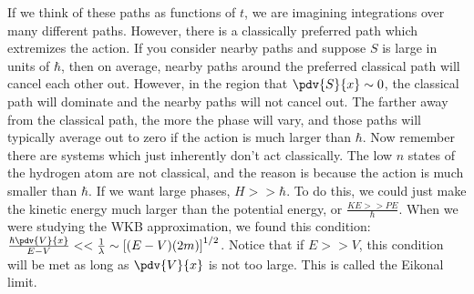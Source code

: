 \documentclass[a4paper,twoside,master.tex]{subfiles}
\begin{document}
If we think of these paths as functions of $ t $, we are imagining integrations over many different paths. However, there is a classically preferred path which extremizes the action. If you consider nearby paths and suppose $ S $ is large in units of $ \hbar $, then on average, nearby paths around the preferred classical path will cancel each other out. However, in the region that $ \pdv{S}{x} \sim 0 $, the classical path will dominate and the nearby paths will not cancel out. The farther away from the classical path, the more the phase will vary, and those paths will typically average out to zero if the action is much larger than $ \hbar $. Now remember there are systems which just inherently don't act classically. The low $ n $ states of the hydrogen atom are not classical, and the reason is because the action is much smaller than $ \hbar $. If we want large phases, $ H >> \hbar $. To do this, we could just make the kinetic energy much larger than the potential energy, or $ \frac{KE >> PE}{\hbar} $. When we were studying the WKB approximation, we found this condition: $ \frac{\hbar \pdv{V}{x}}{E-V} << \frac{1}{\lambda} \sim \left[ (E-V)(2m) \right]^{1/2} $. Notice that if $ E>>V $, this condition will be met as long as $ \pdv{V}{x} $ is not too large. This is called the Eikonal limit.
\end{document}
